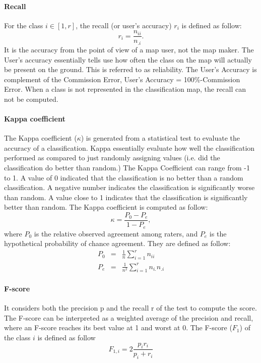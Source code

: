 \paragraph{Recall \\}
For the class $i \in [1,r]$, the recall (or user's accuracy) $r_{i}$ is defined as follow:
\begin{equation}
r_{i}=\frac{n_{ii}}{n_{.i}}.
\end{equation}
It is the accuracy from the point of view of a map user, not the map maker. The User's accuracy essentially tells use how often the class on the map will actually be present on the ground. This is referred to as reliability. The User's Accuracy is complement of the Commission Error, User's Accuracy = 100\%-Commission Error. When a class is not represented in the classification map, the recall can not be computed.


\paragraph{Kappa coefficient \citep{cohen1960coefficient}\\} %
The Kappa coefficient ($\kappa$) is generated from a statistical test to evaluate the accuracy of a classification. Kappa essentially evaluate how well the classification performed as compared to just randomly assigning values (i.e. did the classification do better than random.) The Kappa Coefficient can range from -1 to 1. A value of 0 indicated that the classification is no better than a random classification. A negative number indicates the classification is significantly worse than random. A value close to 1 indicates that the classification is significantly better than random.
The Kappa coefficient is computed as follow:
\begin{equation}
\kappa=\frac{P_{0}-P_{e}}{1-P_{e}},
\end{equation}
where $P_{0}$ is the relative observed agreement among raters, and $P_{e}$ is the hypothetical probability of chance agreement. They are defined as follow:
\begin{eqnarray}
P_{0} & = & \frac{1}{n}\sum_{i=1}^{r}n_{ii} \\
P_{e} & = & \frac{1}{n^{2}}\sum_{i=1}^{r}n_{i.}n_{.i}
\end{eqnarray}

\paragraph{F-score \\}
It considers both the precision p and the recall r of the test to compute the score. The F-score can be interpreted as a weighted average of the precision and recall, where an F-score reaches its best value at 1 and worst at 0. The F-score ($F_{1}$) of the class $i$ is defined as follow
\begin{equation}
F_{1,i}=2\frac{p_{i}r_{i}}{p_{i}+r_{i}}
\end{equation}

